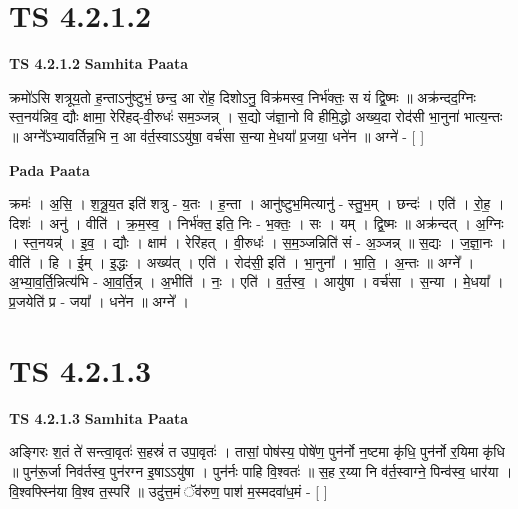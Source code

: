 \documentclass[17pt]{extarticle}
\begin{document}
\section*{ TS 4.2.1.2 }

\textbf{TS 4.2.1.2 } \newline
\textbf{Samhita Paata} \newline

क्रमो॑ऽसि शत्रूय॒तो ह॒न्ताऽनु॑ष्टुभं॒ छन्द॒ आ रो॑ह॒ दिशोऽनु॒ विक्र॑मस्व॒ निर्भ॑क्तः॒ स यं द्वि॒ष्मः ॥ अक्र॑न्दद॒ग्निः स्त॒नय॑न्निव॒ द्यौः क्षामा॒ रेरि॑हद्-वी॒रुधः॑ सम॒ञ्जन्न् । स॒द्यो ज॑ज्ञा॒नो वि हीमि॒द्धो अख्य॒दा रोद॑सी भा॒नुना॑ भात्य॒न्तः ॥ अग्ने᳚ऽभ्यावर्तिन्न॒भि न॒ आ व॑र्त॒स्वाऽऽयु॑षा॒ वर्च॑सा स॒न्या मे॒धया᳚ प्र॒जया॒ धने॑न ॥ अग्ने॑ - [  ] \newline

\textbf{Pada Paata} \newline

क्रमः॑ । अ॒सि॒ । श॒त्रू॒य॒त इति॑ शत्रु - य॒तः । ह॒न्ता । आनु॑ष्टुभ॒मित्यानु॑ - स्तु॒भ॒म् । छन्दः॑ । एति॑ । रो॒ह॒ । दिशः॑ । अनु॑ । वीति॑ । क्र॒म॒स्व॒ । निर्भ॑क्त॒ इति॒ निः - भ॒क्तः॒ । सः । यम् । द्वि॒ष्मः ॥ अक्र॑न्दत् । अ॒ग्निः । स्त॒नयन्न्॑ । इ॒व॒ । द्यौः । क्षाम॑ । रेरि॑हत् । वी॒रुधः॑ । स॒म॒ञ्जन्निति॑ सं - अ॒ञ्जन्न् ॥ स॒द्यः । ज॒ज्ञा॒नः । वीति॑ । हि । ई॒म् । इ॒द्धः । अख्य॑त् । एति॑ । रोद॑सी॒ इति॑ । भा॒नुना᳚ । भा॒ति॒ । अ॒न्तः ॥ अग्ने᳚ । अ॒भ्या॒व॒र्ति॒न्नित्य॑भि - आ॒व॒र्ति॒न्न् । अ॒भीति॑ । नः॒ । एति॑ । व॒र्त॒स्व॒ । आयु॑षा । वर्च॑सा । स॒न्या । मे॒धया᳚ । प्र॒जयेति॑ प्र - जया᳚ । धने॑न ॥ अग्ने᳚ ।  \newline




\section*{ TS 4.2.1.3 }

\textbf{TS 4.2.1.3 } \newline
\textbf{Samhita Paata} \newline

अङ्गिरः श॒तं ते॑ सन्त्वा॒वृतः॑ स॒हस्रं॑ त उपा॒वृतः॑ । तासां॒ पोष॑स्य॒ पोषे॑ण॒ पुन॑र्नो न॒ष्टमा कृ॑धि॒ पुन॑र्नो र॒यिमा कृ॑धि ॥ पुन॑रू॒र्जा निव॑र्तस्व॒ पुन॑रग्न इ॒षाऽऽयु॑षा । पुन॑र्नः पाहि वि॒श्वतः॑ ॥ स॒ह र॒य्या नि व॑र्त॒स्वाग्ने॒ पिन्व॑स्व॒ धार॑या । वि॒श्वफ्स्नि॑या वि॒श्व त॒स्परि॑ ॥ उदु॑त्त॒मं ॅव॑रुण॒ पाश॑ म॒स्मदवा॑ध॒मं - [  ] \newline
\end{document}
